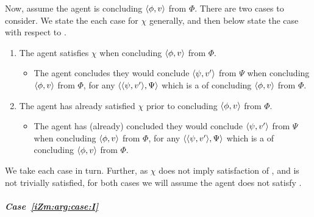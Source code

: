 \begin{note}
  Now, assume the agent is concluding \(\langle \phi, v \rangle\) from \(\Phi\).
  There are two cases to consider.
  We state the each case for \(\chi\) generally, and then below state the case with respect to \izetaSm{}.
  \begin{enumerate}[label=\Roman*., ref=\Roman*]
  \item
    \label{iZm:arg:case:I}
    The agent satisfies \(\chi\) when concluding \(\langle \phi, v \rangle\) from \(\Phi\).
    \begin{itemize}
    \item
      The agent concludes they would conclude \(\langle \psi, v' \rangle\) from \(\Psi\) when concluding \(\langle \phi, v \rangle\) from \(\Phi\), for any \(\langle \langle \psi, v' \rangle, \Psi \rangle\) which is a \requ{} of concluding \(\langle \phi, v \rangle\) from \(\Phi\).
    \end{itemize}
  \item
    \label{iZm:arg:case:II}
    The agent has already satisfied \(\chi\) prior to concluding \(\langle \phi, v \rangle\) from \(\Phi\).
    \begin{itemize}
    \item
      The agent has (already) concluded they would conclude \(\langle \psi, v' \rangle\) from \(\Psi\) when concluding \(\langle \phi, v \rangle\) from \(\Phi\), for any \(\langle \langle \psi, v' \rangle, \Psi \rangle\) which is a \requ{} of concluding \(\langle \phi, v \rangle\) from \(\Phi\).
    \end{itemize}
  \end{enumerate}

  We take each case in turn.
  Further, as \(\chi\) does not imply satisfaction of \izetaS{}, and \izetaS{} is not trivially satisfied, for both cases we will assume the agent does not satisfy \izetaS{}.
\end{note}

\subparagraph*{Case~\ref{iZm:arg:case:I}}

